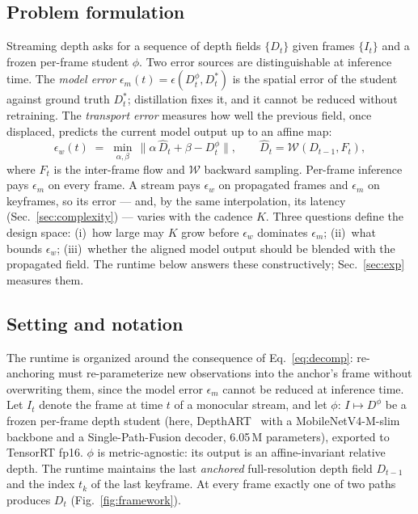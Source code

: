 \documentclass[10pt,twocolumn]{article}
\begin{document}
\subsection{Problem formulation}
\label{sec:formulation}
Streaming depth asks for a sequence of depth fields $\{D_t\}$ given frames
$\{I_t\}$ and a frozen per-frame student $\phi$. Two error sources are
distinguishable at inference time. The \emph{model error}
$\epsilon_m(t) = \epsilon(D^{\phi}_t, D^{*}_t)$ is the spatial error of the
student against ground truth $D^{*}_t$; distillation fixes it, and it
cannot be reduced without retraining. The \emph{transport error} measures
how well the previous field, once displaced, predicts the current model
output up to an affine map:
\begin{equation}
  \epsilon_w(t) \;=\; \min_{\alpha,\beta}\,
  \big\lVert \alpha\,\hat{D}_t + \beta - D^{\phi}_t \big\rVert,
  \qquad \hat{D}_t = \mathcal{W}(D_{t-1}, F_t),
  \label{eq:decomp}
\end{equation}
where $F_t$ is the inter-frame flow and $\mathcal{W}$ backward sampling.
Per-frame inference pays $\epsilon_m$ on every frame. A stream pays
$\epsilon_w$ on propagated frames and $\epsilon_m$ on keyframes, so its
error --- and, by the same interpolation, its latency
(Sec.~\ref{sec:complexity}) --- varies with the cadence $K$. Three
questions define the design space: (i)~how large may $K$ grow before
$\epsilon_w$ dominates $\epsilon_m$; (ii)~what bounds $\epsilon_w$;
(iii)~whether the aligned model output should be blended with the
propagated field. The runtime below answers these constructively;
Sec.~\ref{sec:exp} measures them.

\subsection{Setting and notation}
The runtime is organized around the consequence of Eq.~\ref{eq:decomp}:
re-anchoring must re-parameterize new observations into the anchor's frame
without overwriting them, since the model error $\epsilon_m$ cannot be
reduced at inference time.
Let $I_t$ denote the frame at time $t$ of a monocular stream, and let
$\phi:\, I \mapsto D^{\phi}$ be a frozen per-frame depth student (here,
DepthART~\cite{depthart} with a MobileNetV4-M-slim backbone and a
Single-Path-Fusion decoder, 6.05\,M parameters), exported to TensorRT fp16.
$\phi$ is metric-agnostic: its output is an affine-invariant relative depth.
The runtime maintains the last \emph{anchored} full-resolution depth field
$D_{t-1}$ and the index $t_k$ of the last keyframe. At every frame exactly one
of two paths produces $D_t$ (Fig.~\ref{fig:framework}).
\end{document}
